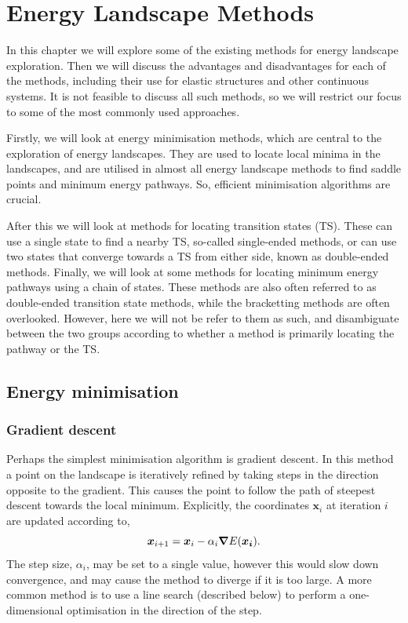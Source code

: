 \chapter{Energy Landscape Methods}
\label{ch:methods}
\graphicspath{{methods/fig/}}

In this chapter we will explore some of the existing methods for energy landscape exploration.
Then we will discuss the advantages and disadvantages for each of the methods, including their use for elastic structures and other continuous systems.
It is not feasible to discuss all such methods, so we will restrict our focus to some of the most commonly used approaches.

Firstly, we will look at energy minimisation methods, which are central to the exploration of energy landscapes.
They are used to locate local minima in the landscapes, and are utilised in almost all energy landscape methods to find saddle points and minimum energy pathways.
So, efficient minimisation algorithms are crucial.

After this we will look at methods for locating transition states (TS).
These can use a single state to find a nearby TS, so-called single-ended methods, or can use two states that converge towards a TS from either side, known as double-ended methods.
Finally, we will look at some methods for locating minimum energy pathways using a chain of states.
These methods are also often referred to as double-ended transition state methods, while the bracketting methods are often overlooked.
However, here we will not be refer to them as such, and disambiguate between the two groups according to whether a method is primarily locating the pathway or the TS.



\section{Energy minimisation}

\subsection{Gradient descent}
Perhaps the simplest minimisation algorithm is gradient descent.
In this method a point on the landscape is iteratively refined by taking steps in the direction opposite to the gradient.
This causes the point to follow the path of steepest descent towards the local minimum.
Explicitly, the coordinates $\bm{x}_i$ at iteration $i$ are updated according to,
\begin{equation}
  \bm{x}_{i+1} = \bm{x}_i - \alpha_i \bm{\nabla} E(\bm{x_i}).
  \label{eq:lm-graddescent}
\end{equation}
The step size, $\alpha_i$, may be set to a single value, however this would slow down convergence, and may cause the method to diverge if it is too large.
A more common method is to use a line search (described below) to perform a one-dimensional optimisation in the direction of the step.

